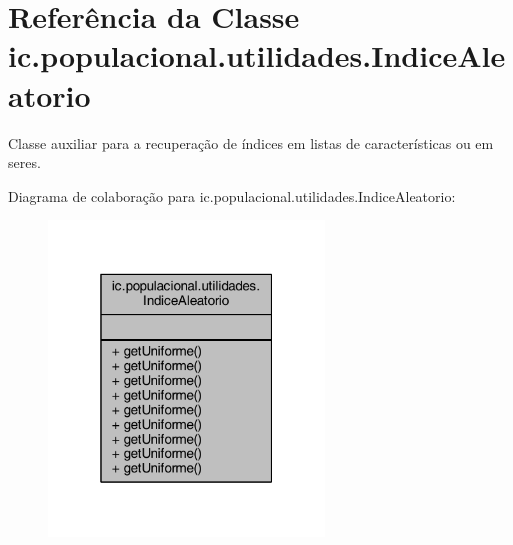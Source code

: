 \hypertarget{classic_1_1populacional_1_1utilidades_1_1_indice_aleatorio}{\section{Referência da Classe ic.\-populacional.\-utilidades.\-Indice\-Aleatorio}
\label{classic_1_1populacional_1_1utilidades_1_1_indice_aleatorio}
}


Classe auxiliar para a recuperação de índices em listas de características ou em seres.  




Diagrama de colaboração para ic.\-populacional.\-utilidades.\-Indice\-Aleatorio\-:\nopagebreak
\begin{figure}[H]
\begin{center}
\leavevmode
\includegraphics[width=208pt]{classic_1_1populacional_1_1utilidades_1_1_indice_aleatorio__coll__graph}
\end{center}
\end{figure}
